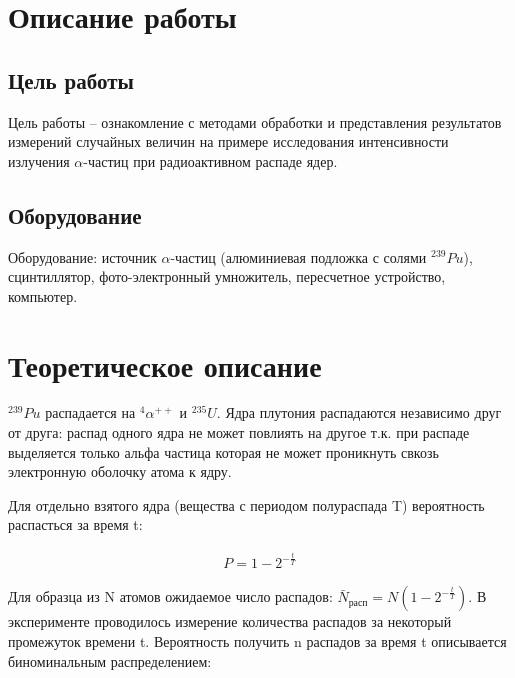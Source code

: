 \documentclass[a4paper,14pt]{article}
\begin{document}

\tableofcontents    
\newpage            

\section{Описание работы}
\subsection{Цель работы}
Цель работы – ознакомление с методами обработки и представления
результатов измерений случайных величин на примере исследования интенсивности излучения $\alpha$-частиц при радиоактивном распаде ядер.

\subsection{Оборудование}
Оборудование: источник $\alpha$-частиц (алюминиевая подложка с солями $ ^{239}Pu$), сцинтиллятор, фото-электронный умножитель, пересчетное устройство, компьютер.



\section{Теоретическое описание}
 $ ^{239}Pu$ распадается на $^4\alpha^{++}$ и $^{235}U$. Ядра плутония распадаются независимо друг от друга: распад одного ядра не может повлиять на другое т.к.
при распаде выделяется только альфа частица которая не может проникнуть свкозь электронную оболочку атома к ядру.

Для отдельно взятого ядра (вещества с периодом полураспада T) вероятность распасться за время t:

\begin{equation}
\begin{aligned}
P = 1 - 2^{-\frac{t}{T}}
 \label{eq:prob1}
 \end{aligned}
\end{equation}

Для образца из N атомов ожидаемое число распадов: $\bar{N}_{\text{расп}} = N(1 - 2^{-\frac{t}{T}})$.
В эксперименте проводилось измерение количества распадов за некоторый промежуток времени t.
Вероятность получить n распадов за время t описывается биноминальным распределением:
\end{document}
